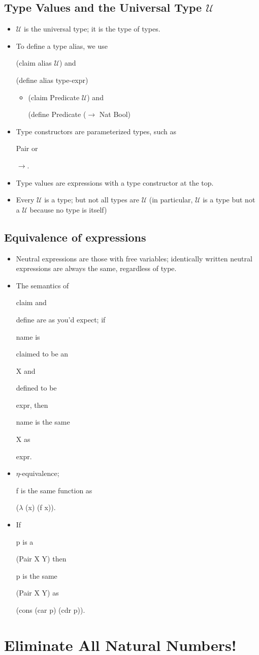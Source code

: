 \documentclass{article}
\newcommand*{\SavedLstInline}{}
\DeclareRobustCommand*{\lstinline}{%
  \ifmmode
    \let\SavedBGroup\bgroup
    \def\bgroup{%
      \let\bgroup\SavedBGroup
      \hbox\bgroup
    }%
  \fi
  \SavedLstInline
}
\begin{document}
\subsection{Type Values and the Universal Type \(\mathcal{U}\)}
\begin{itemize}
    \item \lstinline{$\mathcal{U}$} is the universal type; it is the type of types.
    \item To define a type alias, we use \lstinline{(claim alias $\mathcal{U}$)} and \lstinline{(define alias type-expr)}
        \begin{itemize}
            \item \lstinline{(claim Predicate $\mathcal{U}$)} and \lstinline{(define Predicate (\(\rightarrow\) Nat Bool)}
        \end{itemize}
    \item Type constructors are parameterized types, such as \lstinline{Pair} or \lstinline{\(\rightarrow\)}.
    \item Type values are expressions with a type constructor at the top.
    \item Every \(\mathcal{U}\) is a type; but not all types are \(\mathcal{U}\) (in particular, \(\mathcal{U}\) is a type but not a \(\mathcal{U}\) because no type is itself)
\end{itemize}
\subsection{Equivalence of expressions}
\begin{itemize}
    \item Neutral expressions are those with free variables; identically written neutral expressions are always the same, regardless of type.
    \item The semantics of \lstinline{claim} and \lstinline{define} are as you'd expect; if \lstinline{name} is \lstinline{claim}ed to be an \lstinline{X} and \lstinline{define}d to be \lstinline{expr}, then \lstinline{name} is the same \lstinline{X} as \lstinline{expr}.
    \item \(\eta\)-equivalence; \lstinline{f} is the same function as \lstinline{(\(\lambda\) (x) (f x))}.
    \item If \lstinline{p} is a \lstinline{(Pair X Y)} then \lstinline{p} is the same \lstinline{(Pair X Y)} as \lstinline{(cons (car p) (cdr p))}.
\end{itemize}
\section{Eliminate All Natural Numbers!}
\end{document}
